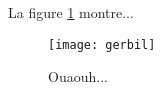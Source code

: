 \documentclass{article}
\begin{document}
La figure \ref{fig:gerbil} montre...

\begin{figure}
\centering
\texttt{[image: gerbil]}
\caption{\label{fig:gerbil}Ouaouh...}
\end{figure}
\end{document}
